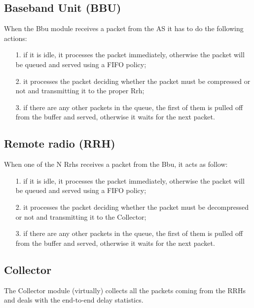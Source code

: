 \documentclass[11pt,a4paper,oneside, openright]{article}
\begin{document}
\subsection{Baseband Unit (BBU)}
When the Bbu module receives a packet from the AS it has to do the following actions:
\begin{itemize}
    \item[1.] if it is idle, it processes the packet immediately, otherwise the packet will be queued and served using a FIFO policy;
    \item[2.] it processes the packet deciding whether the packet must be compressed or not and transmitting it to the proper Rrh;
    \item[3.] if there are any other packets in the queue, the first of them is pulled off from the buffer and served, otherwise it waits for the next packet.
\end{itemize}

\subsection{Remote radio (RRH)}
When one of the N Rrhs receives a packet from the Bbu, it acts as follow:
\begin{itemize}
    \item[1.] if it is idle, it processes the packet immediately, otherwise the packet will be queued and served using a FIFO policy;
    \item[2.] it processes the packet deciding whether the packet must be decompressed or not and transmitting it to the Collector;
    \item[3.] if there are any other packets in the queue, the first of them is pulled off from the buffer and served, otherwise it waits for the next packet.
\end{itemize}


\subsection{Collector}
The Collector module (virtually) collects all the packets coming from the RRHs and deals with the end-to-end delay statistics.
\end{document}
